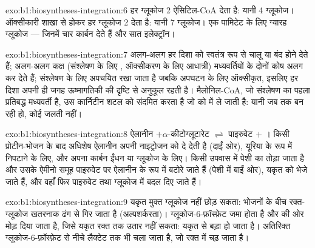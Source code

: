\begin{solution}{exo:b1:biosyntheses-integration:6}
हर ग्लूकोज 2 ऐसिटिल-CoA देता है: यानी 4 ग्लूकोज। ऑक्सीकारी शाखा से होकर
हर ग्लूकोज 2  देता है: यानी 7 ग्लूकोज। एक पामिटेट के लिए ग्यारह
ग्लूकोज --- जिनमें चार कार्बन देते हैं और सात इलेक्ट्रॉन।
\end{solution}

\begin{solution}{exo:b1:biosyntheses-integration:7}
अलग-अलग  हर दिशा को स्वतंत्र रूप से चालू या बंद होने देते हैं;
अलग-अलग कक्ष (संश्लेषण के लिए , ऑक्सीकरण के लिए आधात्री)
मध्यवर्तियों के दोनों कोष अलग कर देते हैं;  संश्लेषण के लिए
अपचयित रखा जाता है जबकि  अपघटन के लिए ऑक्सीकृत, इसलिए
हर दिशा अपनी ही जगह ऊष्मागतिकी की दृष्टि से अनुकूल रहती है।
मैलोनिल-CoA, जो संश्लेषण का पहला प्रतिबद्ध मध्यवर्ती है, उस कार्निटीन
शटल को संदमित करता है जो  को  में ले जाती है:
यानी जब तक  बन रही हो, कोई जलती नहीं।
\end{solution}

\begin{solution}{exo:b1:biosyntheses-integration:8}
ऐलानीन $+ \alpha$-कीटोग्लूटारेट $\rightleftharpoons$ पाइरुवेट $+$
। किसी प्रोटीन-भोजन के बाद अधिशेष ऐलानीन अपनी नाइट्रोजन
 को दे देती है (दाईं ओर), यूरिया के रूप में निपटाने के लिए, और
अपना कार्बन ईंधन या ग्लूकोज के लिए। किसी उपवास में पेशी का  तोड़ा
जाता है और उसके ऐमीनो समूह पाइरुवेट पर ऐलानीन के रूप में बटोरे जाते हैं
(पेशी में बाईं ओर), यकृत को भेजे जाते हैं, और वहाँ फिर पाइरुवेट तथा
ग्लूकोज में बदल दिए जाते हैं।
\end{solution}

\begin{solution}{exo:b1:biosyntheses-integration:9}
यकृत मुक्त ग्लूकोज नहीं छोड़ सकता: भोजनों के बीच रक्त-ग्लूकोज खतरनाक
ढंग से गिर जाता है (अल्पशर्करता)। ग्लूकोज-6-फ़ॉस्फ़ेट
जमा होता है और  की ओर मोड़ दिया जाता है, जिसे यकृत रक्त तक
उतार नहीं सकता: यकृत  से बड़ा हो जाता है। अतिरिक्त
ग्लूकोज-6-फ़ॉस्फ़ेट  से नीचे लैक्टेट तक भी चला जाता है, जो
रक्त में चढ़ जाता है।
\end{solution}

